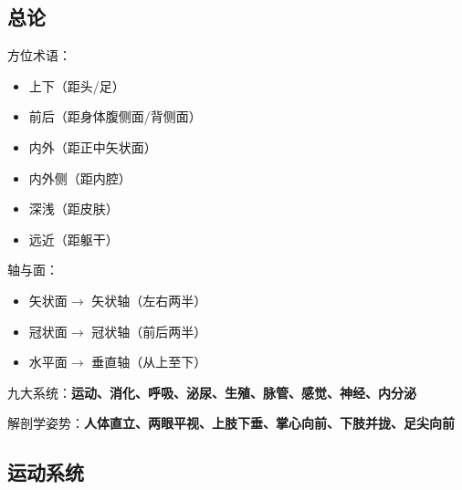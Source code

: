 \subsection{总论}%
\label{sub:复习：总论}
\begin{notation}
    方位术语：
    \begin{itemize}
        \item 上下（距头/足）
        \item 前后（距身体腹侧面/背侧面）
        \item 内外（距正中矢状面）
        \item 内外侧（距内腔）
        \item 深浅（距皮肤）
        \item 远近（距躯干）
    \end{itemize}
\end{notation}
\begin{notation}
    轴与面：
    \begin{itemize}
        \item 矢状面$\to $ 矢状轴（左右两半）
        \item 冠状面$\to $ 冠状轴（前后两半）
        \item 水平面$\to $ 垂直轴（从上至下）
    \end{itemize}
\end{notation}
\begin{notation}
    九大系统：\textbf{运动、消化、呼吸、泌尿、生殖、脉管、感觉、神经、内分泌}
\end{notation}
\begin{notation}
    解剖学姿势：\textbf{人体直立、两眼平视、上肢下垂、掌心向前、下肢并拢、足尖向前}
\end{notation}
\subsection{运动系统}%
\label{sub:复习：运动系统}
